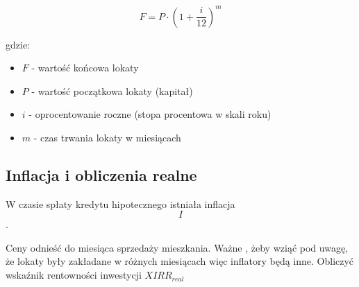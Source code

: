 \[
F = P \cdot \left(1 + \frac{i}{12}\right)^{m}
\]

gdzie:
\begin{itemize}
  \item \(F\) - wartość końcowa lokaty
  \item \(P\) - wartość początkowa lokaty (kapitał)
  \item \(i\) - oprocentowanie roczne (stopa procentowa w skali roku)
  \item \(m\) - czas trwania lokaty w miesiącach
\end{itemize}



\subsection{Inflacja i obliczenia realne}


W czasie spłaty kredytu hipotecznego istniała inflacja \[ I \]. 

Ceny odnieść do miesiąca sprzedaży mieszkania. Ważne , żeby wziąć pod uwagę, że lokaty były zakładane w różnych miesiącach więc inflatory będą inne. 
Obliczyć wskaźnik rentowności inwestycji \(XIRR_{real}\)



